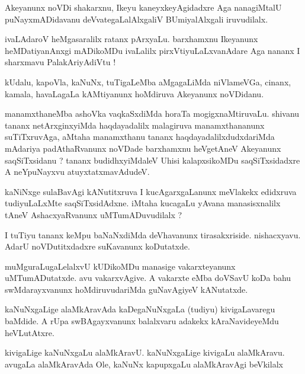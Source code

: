 \documentclass{article}
\begin{document}
\begin{mn}
Akeyanunx noVDi shakarxnu, Ikeyu kaneyxkeyAgidadxre Aga nanagiMtalU puNayxmADidavanu 
deVvategaLalAlxgaliV BUmiyalAlxgali iruvudilalx.
\end{mn}

\begin{mn}
ivaLAdaroV heMgasaralilx ratanx pArxyaLu.  barxhamxnu Ikeyanunx  heMDatiyanAnxgi  
mADikoMDu  ivaLalilx pirxVtiyuLaLxvanAdare Aga nananx I sharxmavu PalakAriyAdiVtu !
\end{mn}

\begin{mn}
kUdalu,  kapoVla,  kaNuNx,  tuTigaLeMba  aMgagaLiMda  niVlameVGa, cinanx,  kamala,  
havaLagaLa  kAMtiyanunx  hoMdiruva  Akeyanunx noVDidanu.
\end{mn}

\begin{mn}
manamxthaneMba ashoVka vaqkaSxdiMda horaTa mogigxnaMtiruvaLu.  shivanu tananx 
netArxginxyiMda haqdayadalilx malagiruva manamxthananunx suTiTxruvAga, aMtaha 
manamxthanu tananx haqdayadalilxdudxdariMda mAdariya padAthaRvanunx noVDade 
barxhamxnu heVgetAneV Akeyanunx saqSiTxsidanu ?  tananx budidhxyiMdaleV  Uhisi  
kalapxsikoMDu saqSiTxsidadxre A neYpuNayxvu  atuyxtatxmavAdudeV.
\end{mn}

\begin{mn}
kaNiNxge sulaBavAgi kANutitxruva I kucAgarxgaLanunx meVlakekx edidxruva tudiyuLaLxMte 
saqSiTxsidAdxne.  iMtaha kucagaLu yAvana manasisxnalilx tAneV AshacxyaRvanunx uMTumADuvudilalx ?
\end{mn}

\begin{mn}
I tuTiyu tananx keMpu baNaNxdiMda deVhavanunx tirasakxriside.  nishacxyavu.  
AdarU  noVDutitxdadxre suKavanunx koDutatxde.
\end{mn}

\begin{mn}
muMguraLugaLelalxvU kUDikoMDu manasige vakarxteyanunx  uMTumADutatxde. avu vakarxvAgive. 
A vakarxte eMba doVSavU koDa bahu swMdarayxvanunx hoMdiruvudariMda guNavAgiyeV kANutatxde.
\end{mn}

\begin{mn}
kaNuNxgaLige  alaMkAravAda kaDegaNuNxgaLa (tudiyu) kivigaLavaregu baMdide.  
A rUpa swBAgayxvanunx  balalxvaru adakekx kAraNavideyeMdu heVLutAtxre. 
\end{mn}

\begin{mn}
kivigaLige kaNuNxgaLu alaMkAravU.  kaNuNxgaLige kivigaLu alaMkAravu.  avugaLa 
alaMkAravAda Ole, kaNuNx kapupxgaLu alaMkAravAgi beVkilalx
\end{mn}
\end{document}
